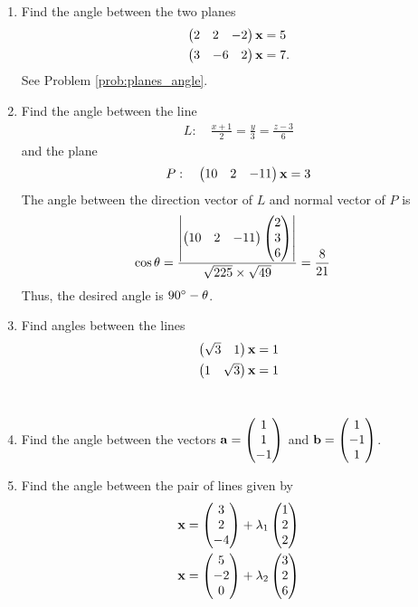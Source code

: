 \documentclass[journal,12pt,twocolumn]{IEEEtran}
\renewcommand\thesection{\arabic{section}}
\begin{document}
\begin{enumerate}[label=\thesection.\arabic*.,ref=\thesection.\theenumi]
\item Find the angle between the two planes
\begin{align}
\begin{pmatrix}2 & 2 & -2\end{pmatrix}\mathbf{x}&=5
\\
\begin{pmatrix}3 &-6 & 2\end{pmatrix}\mathbf{x}&=7.
\end{align}
%
\solution See Problem \eqref{prob:planes_angle}.
%
\item Find the angle between the line 
%
\begin{align}
L: \quad \frac{x+1}{2} = \frac{y}{3} = \frac{z-3}{6} 
\end{align}
%
and
%
the plane 
\begin{align}
P: \quad \begin{pmatrix}10 & 2 & -11\end{pmatrix}\mathbf{x}=3
\end{align}
%
\label{prob:plane_angle_line}
%
\solution The angle between the direction vector of $L$ and normal vector of $P$ is 
%
\begin{align}
\cos \theta &= \frac{\left\vert\begin{pmatrix}10 & 2 & -11\end{pmatrix}\begin{pmatrix}2\\3\\6\end{pmatrix}\right\vert}{\sqrt{225}\times \sqrt{49}} = \frac{8}{21}
\end{align}
%
Thus, the desired angle is $90\degree -\theta$.
\item Find angles between the lines
\begin{align}
\begin{pmatrix}\sqrt{3} & 1\end{pmatrix}\mathbf{x} &= 1
\\
\begin{pmatrix}1 & \sqrt{3}\end{pmatrix}\mathbf{x} &= 1
\end{align}
\\
\solution
%
\item Find the angle between the vectors 
$\mathbf{a}=\begin{pmatrix}1\\1\\-1\end{pmatrix}$
  and 
$\mathbf{b}=\begin{pmatrix}1\\-1\\1\end{pmatrix}$.
%
\\
\solution 
%
%
\item Find the angle between the pair of lines given by 
\begin{align}
\vec{x} &= \myvec{3\\2\\-4} + \lambda_1\myvec{1 \\ 2 \\2}
\\
\vec{x} &= \myvec{5\\-2\\0} + \lambda_2\myvec{3 \\ 2 \\6}

\end{align}
\end{enumerate}
\end{document}
